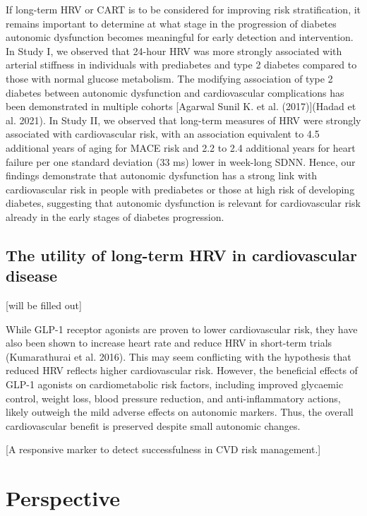 \documentclass[
  a4paper,
  headsepline=true,
  open=any]{scrbook}
\begin{document}
If long-term HRV or CART is to be considered for improving risk
stratification, it remains important to determine at what stage in the
progression of diabetes autonomic dysfunction becomes meaningful for
early detection and intervention. In Study I, we observed that 24-hour
HRV was more strongly associated with arterial stiffness in individuals
with prediabetes and type 2 diabetes compared to those with normal
glucose metabolism. The modifying association of type 2 diabetes between
autonomic dysfunction and cardiovascular complications has been
demonstrated in multiple cohorts {[}Agarwal Sunil K. et al.
(2017){]}(Hadad et al. 2021). In Study II, we observed that long-term
measures of HRV were strongly associated with cardiovascular risk, with
an association equivalent to 4.5 additional years of aging for MACE risk
and 2.2 to 2.4 additional years for heart failure per one standard
deviation (33 ms) lower in week-long SDNN. Hence, our findings
demonstrate that autonomic dysfunction has a strong link with
cardiovascular risk in people with prediabetes or those at high risk of
developing diabetes, suggesting that autonomic dysfunction is relevant
for cardiovascular risk already in the early stages of diabetes
progression.

\hypertarget{the-utility-of-long-term-hrv-in-cardiovascular-disease}{%
\section{The utility of long-term HRV in cardiovascular
disease}\label{the-utility-of-long-term-hrv-in-cardiovascular-disease}}

{[}will be filled out{]}

While GLP-1 receptor agonists are proven to lower cardiovascular risk,
they have also been shown to increase heart rate and reduce HRV in
short-term trials (Kumarathurai et al. 2016). This may seem conflicting
with the hypothesis that reduced HRV reflects higher cardiovascular
risk. However, the beneficial effects of GLP-1 agonists on
cardiometabolic risk factors, including improved glycaemic control,
weight loss, blood pressure reduction, and anti-inflammatory actions,
likely outweigh the mild adverse effects on autonomic markers. Thus, the
overall cardiovascular benefit is preserved despite small autonomic
changes.

{[}A responsive marker to detect successfulness in CVD risk
management.{]}


\hypertarget{perspective}{%
\chapter{Perspective}\label{perspective}}
\end{document}
